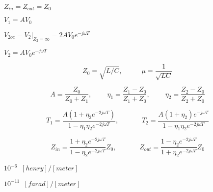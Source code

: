 {\newpage\clearpage
{}%
$Z_{in}=Z_{out}=Z_0$%
\lthtmlinlinemathZ
\lthtmlcheckvsize\clearpage}

{\newpage\clearpage
{}%
$V_1=AV_0$%
\lthtmlinlinemathZ
\lthtmlcheckvsize\clearpage}

{\newpage\clearpage
{}%
$V_{2oc}=V_2\big|_{Z_2=\infty}=2AV_0 e^{-j\omega T}$%
\lthtmlinlinemathZ
\lthtmlcheckvsize\clearpage}

{\newpage\clearpage
{}%
$V_2=AV_0e^{-j\omega T}$%
\lthtmlinlinemathZ
\lthtmlcheckvsize\clearpage}

{\newpage\clearpage
{}%
\begin{displaymath}	Z_0=\sqrt{L/C},\;\;\;\;\;\;\;\;\;\;\mu=\frac{1}{\sqrt{LC}}	\end{displaymath}%
\lthtmldisplayZ
\lthtmlcheckvsize\clearpage}

{\newpage\clearpage
{}%
\begin{displaymath} A=\frac{Z_0}{Z_0+Z_1},\;\;\;\;\;\;\;\; \eta_1=\frac{Z_1-Z_0}{Z_1+Z_0},
  \;\;\;\;\;\;\;\;\eta_2=\frac{Z_2-Z_0}{Z_2+Z_0} \end{displaymath}%
\lthtmldisplayZ
\lthtmlcheckvsize\clearpage}

{\newpage\clearpage
{}%
\begin{displaymath} T_1=\frac{A(1+\eta_2e^{-2j\omega T})}{1-\eta_1\eta_2e^{-2j\omega T}},
  \;\;\;\;\;\;\;\;\;\;\;\;
  T_2=\frac{A(1+\eta_2)e^{-j\omega T}}{1-\eta_1\eta_2e^{-2j\omega T}} \end{displaymath}%
\lthtmldisplayZ
\lthtmlcheckvsize\clearpage}

{\newpage\clearpage
{}%
\begin{displaymath} Z_{in}=\frac{1+\eta_2e^{-2j\omega T}}{1-\eta_2e^{-2j\omega T}}Z_0,
  \;\;\;\;\;\;\;\;\;\;\;\;
  Z_{out}=\frac{1-\eta_2e^{-2j\omega T}}{1+\eta_2e^{-2j\omega T}}Z_0 \end{displaymath}%
\lthtmldisplayZ
\lthtmlcheckvsize\clearpage}

{\newpage\clearpage
{}%
$10^{-6}\;\;[henry]/[meter]$%
\lthtmlinlinemathZ
\lthtmlcheckvsize\clearpage}

{\newpage\clearpage
{}%
$10^{-11}\;\;[farad]/[meter]$%
\lthtmlinlinemathZ
\lthtmlcheckvsize\clearpage}

